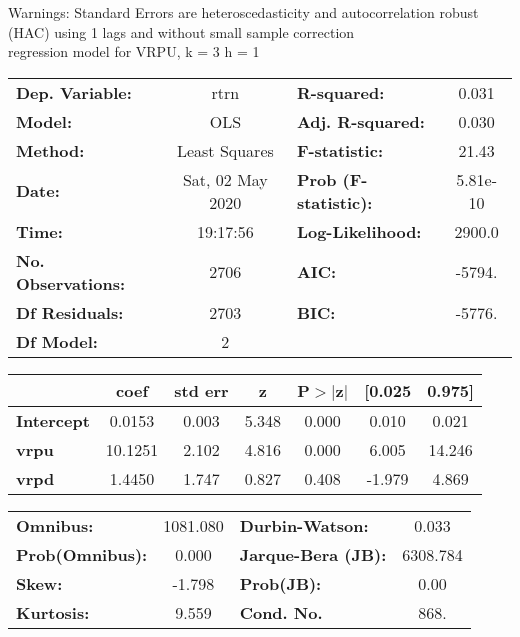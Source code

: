 Warnings: \newline
 [1] Standard Errors are heteroscedasticity and autocorrelation robust (HAC) using 1 lags and without small sample correction\\ 

regression model for VRPU, k = 3 h = 1\begin{center}
\begin{tabular}{lclc}
\toprule
\textbf{Dep. Variable:}    &       rtrn       & \textbf{  R-squared:         } &     0.031   \\
\textbf{Model:}            &       OLS        & \textbf{  Adj. R-squared:    } &     0.030   \\
\textbf{Method:}           &  Least Squares   & \textbf{  F-statistic:       } &     21.43   \\
\textbf{Date:}             & Sat, 02 May 2020 & \textbf{  Prob (F-statistic):} &  5.81e-10   \\
\textbf{Time:}             &     19:17:56     & \textbf{  Log-Likelihood:    } &    2900.0   \\
\textbf{No. Observations:} &        2706      & \textbf{  AIC:               } &    -5794.   \\
\textbf{Df Residuals:}     &        2703      & \textbf{  BIC:               } &    -5776.   \\
\textbf{Df Model:}         &           2      & \textbf{                     } &             \\
\bottomrule
\end{tabular}
\begin{tabular}{lcccccc}
                   & \textbf{coef} & \textbf{std err} & \textbf{z} & \textbf{P$> |$z$|$} & \textbf{[0.025} & \textbf{0.975]}  \\
\midrule
\textbf{Intercept} &       0.0153  &        0.003     &     5.348  &         0.000        &        0.010    &        0.021     \\
\textbf{vrpu}      &      10.1251  &        2.102     &     4.816  &         0.000        &        6.005    &       14.246     \\
\textbf{vrpd}      &       1.4450  &        1.747     &     0.827  &         0.408        &       -1.979    &        4.869     \\
\bottomrule
\end{tabular}
\begin{tabular}{lclc}
\textbf{Omnibus:}       & 1081.080 & \textbf{  Durbin-Watson:     } &    0.033  \\
\textbf{Prob(Omnibus):} &   0.000  & \textbf{  Jarque-Bera (JB):  } & 6308.784  \\
\textbf{Skew:}          &  -1.798  & \textbf{  Prob(JB):          } &     0.00  \\
\textbf{Kurtosis:}      &   9.559  & \textbf{  Cond. No.          } &     868.  \\
\bottomrule
\end{tabular}
\end{center}

